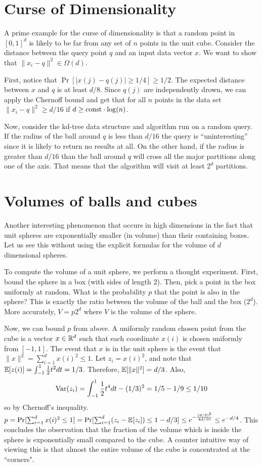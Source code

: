 \documentclass{article}
\begin{document}

\section{Curse of Dimensionality}
A prime example for the curse of dimensionality is that a random point in $[0,1]^d$ is likely to be far from any set of $n$ points in the unit cube.
Consider the distance between the query point $q$ and an input data vector $x$.
We want to show that $\|x_i-q\|^2 \in \Omega(d)$.

First, notice that $\Pr[|x(j)- q(j)| \ge 1/4] \ge 1/2$. The expected distance between $x$ and $q$ is at least $d/8$.
Since $q(j)$ are independently drown, we can apply the Chernoff bound and get that for all $n$ points in the data set
$\|x_i-q\|^2 \ge d/16$ if $d \ge {\operatorname{const}}\cdot\log(n)$.

Now, consider the kd-tree data structure and algorithm run on a random query.
If the radius of the ball around $q$ is less than $d/16$ the query is ``uninteresting'' since it is likely to return no results at all.
On the other hand, if the radius is greater than $d/16$ than the ball around $q$ will cross all the major partitions 
along one of the axis. That means that the algorithm will visit at least $2^d$ partitions.


\section{Volumes of balls and cubes}
Another interesting phenomenon that occurs in high dimensions in the fact that unit spheres 
are exponentially smaller (in volume) than their containing boxes.
Let us see this without using the explicit formulas for the volume of $d$ dimensional spheres.

To compute the volume of a unit sphere, we perform a thought experiment.
First, bound the sphere in a box (with sides of length $2$).
Then, pick a point in the box uniformly at random. What is the probability $p$ that
the point is also in the sphere? This is exactly the ratio between the volume of the ball and the box ($2^d$).
More accurately, $V = p2^d$ where $V$ is the volume of the sphere.

Now, we can bound $p$ from above. 
A uniformly random chosen point from the cube is a vector $x \in {\mathbb{R}}^d$ such that each coordinate $x(i)$
is chosen uniformly from $[-1,1]$. The event that $x$ is in the unit sphere is the event that $\|x\|^2 = \sum_{i=1}^{d}x(i)^2 \le 1$.
Let $z_i = x(i)^2$, and note that 
${\mathbb E}[z(i)] = \int_{-1}^{1}\frac{1}{2}t^2 dt = 1/3$. Therefore, ${\mathbb E}[\|x\|^2] = d/3$. 
Also, 
\[
{\operatorname{Var}}(z_i)  = \int_{-1}^{1}\frac{1}{2}t^4 dt  - (1/3)^2  = 1/5 - 1/9 \le 1/10
\]
so by Chernoff's inequality.
$p = \Pr[\sum_{i=1}^{d}x(i)^2 \le 1]  = \Pr[\sum_{i=1}^{d}(z_i -{\mathbb E}[z_i] ) \le 1-d/3] \le e^{-\frac{(d/3)^2}{4d/10}} \le e^{-d/4}$.
This concludes the observation that the fraction of the volume which is inside the sphere is 
exponentially small compared to the cube.
A counter intuitive way of viewing this is that almost the entire volume of the cube is concentrated at the ``corners".
\end{document}
